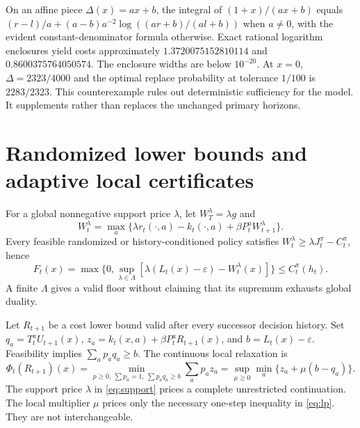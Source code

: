 On an affine piece $\Delta(x)=ax+b$, the integral of $(1+x)/(ax+b)$ equals $(r-l)/a+(a-b)a^{-2}\log((ar+b)/(al+b))$ when $a\ne0$, with the evident constant-denominator formula otherwise. Exact rational logarithm enclosures yield costs approximately $1.3720075152810114$ and $0.8600375764050574$. The enclosure widths are below $10^{-20}$. At $x=0$, $\Delta=2323/4000$ and the optimal replace probability at tolerance $1/100$ is $2283/2323$. This counterexample rules out deterministic sufficiency for the model. It supplements rather than replaces the unchanged primary horizons.

\section{Randomized lower bounds and adaptive local certificates}\label{sec:lp}
For a global nonnegative support price $\lambda$, let $W_T^\lambda=\lambda g$ and
\begin{equation}\label{eq:support}
 W_t^\lambda=\max_a\{\lambda r_t(\cdot,a)-k_t(\cdot,a)+\beta P_t^aW_{t+1}^\lambda\}.
\end{equation}
Every feasible randomized or history-conditioned policy satisfies $W_t^\lambda\geq\lambda J_t^\pi-C_t^\pi$, hence
\begin{equation}\label{eq:floor}
 F_t(x)=\max\{0,\sup_{\lambda\in\Lambda}[\lambda(L_t(x)-\varepsilon)-W_t^\lambda(x)]\}\leq C_t^\pi(h_t).
\end{equation}
A finite $\Lambda$ gives a valid floor without claiming that its supremum exhausts global duality.

Let $R_{t+1}$ be a cost lower bound valid after every successor decision history. Set $q_a=T_t^aU_{t+1}(x)$, $z_a=k_t(x,a)+\beta P_t^aR_{t+1}(x)$, and $b=L_t(x)-\varepsilon$. Feasibility implies $\sum_a p_aq_a\geq b$. The continuous local relaxation is
\begin{equation}\label{eq:lp}
 \Phi_t(R_{t+1})(x)=\min_{p\geq0,\ \sum p_a=1,\ \sum p_aq_a\geq b}\sum_ap_az_a
 =\sup_{\mu\geq0}\min_a\{z_a+\mu(b-q_a)\}.
\end{equation}
The support price $\lambda$ in \eqref{eq:support} prices a complete unrestricted continuation. The local multiplier $\mu$ prices only the necessary one-step inequality in \eqref{eq:lp}. They are not interchangeable.

